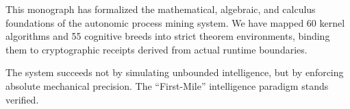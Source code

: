 This monograph has formalized the mathematical, algebraic, and calculus foundations of the  autonomic process mining system. We have mapped 60 kernel algorithms and 55 cognitive breeds into strict theorem environments, binding them to cryptographic receipts derived from actual runtime boundaries.

The system succeeds not by simulating unbounded intelligence, but by enforcing absolute mechanical precision. The ``First-Mile'' intelligence paradigm stands verified.
